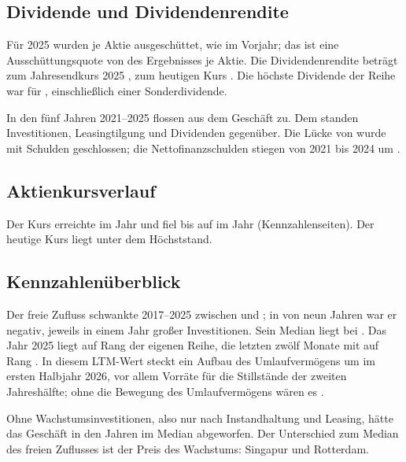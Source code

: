 \subsection{Dividende und Dividendenrendite}

F\"ur 2025 wurden  je Aktie ausgesch\"uttet,
wie im Vorjahr; das ist eine Aussch\"uttungsquote von \Pz{\AusschuettungsQuoteNeste} des
Ergebnisses je Aktie. Die Dividendenrendite betr\"agt zum Jahresendkurs 2025
\DivRenditeJahresende{}, zum heutigen Kurs \DivRenditeHeute. Die h\"ochste Dividende der Reihe
war  f\"ur \DpsMaxJahr, einschlie{\ss}lich einer Sonderdividende.

In den f\"unf Jahren 2021--2025 flossen  aus dem Gesch\"aft zu. Dem
standen  Investitionen,  Leasingtilgung
und  Dividenden gegen\"uber. Die L\"ucke von
 wurde mit Schulden geschlossen; die Nettofinanzschulden
stiegen von 2021 bis 2024 um .

\subsection{Aktienkursverlauf}

\kursabbildung

Der Kurs erreichte  im Jahr \KursMaxJahr{} und fiel bis auf
 im Jahr \KursMinJahr{} (Kennzahlenseiten). Der heutige Kurs liegt
\KursVomHoch{} unter dem H\"ochststand.

\subsection*{Kennzahlen\"uberblick}

\ueberblicktabelle
\zahlungstabelle

Der freie Zufluss schwankte 2017--2025 zwischen  und ;
in \FcfNegativJahre{} von neun Jahren war er negativ, jeweils in einem Jahr gro{\ss}er
Investitionen. Sein Median liegt bei . Das Jahr 2025 liegt auf Rang
\Pz{\FcfRangVoll} der eigenen Reihe, die letzten zw\"olf Monate mit  auf
Rang \Pz{\FcfRangLtm}. In diesem LTM-Wert steckt ein Aufbau des Umlaufverm\"ogens um
 im ersten Halbjahr 2026, vor allem Vorr\"ate f\"ur die Stillst\"ande
der zweiten Jahresh\"alfte; ohne die Bewegung des Umlaufverm\"ogens w\"aren es
.

Ohne Wachstumsinvestitionen, also nur nach Instandhaltung und Leasing, h\"atte das Gesch\"aft
in den Jahren \ErnteJahre{} im Median  abgeworfen. Der Unterschied zum
Median des freien Zuflusses ist der Preis des Wachstums: Singapur und Rotterdam.

